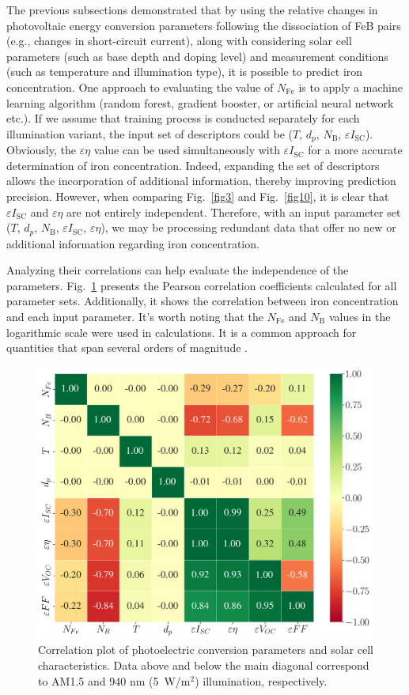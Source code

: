 \documentclass[a4paper,fleqn]{cas-sc}
\begin{document}
The previous subsections demonstrated that by using the relative changes in photovoltaic energy conversion parameters following the dissociation of FeB pairs
(e.g., changes in short-circuit current),
along with considering solar cell parameters (such as base depth and doping level)
and measurement conditions (such as temperature and illumination type), it is possible to predict iron concentration.
One approach to evaluating the value of $N_\mathrm{Fe}$ is to apply a machine learning algorithm (random forest, gradient booster, or artificial neural network etc.).
If we assume that training process is conducted separately for each illumination variant, the input set of descriptors could be
($T$, $d_p$, $N_\mathrm{B}$, $\varepsilon I_\mathrm{SC}$).
Obviously, the $\varepsilon \eta$ value can be used simultaneously with $\varepsilon I_\mathrm{SC}$ for a more accurate determination of iron concentration.
Indeed, expanding the set of descriptors allows the incorporation of additional information, thereby improving prediction precision.
However, when comparing Fig.~\ref{fig3} and Fig.~\ref{fig10}, it is clear that  $\varepsilon I_\mathrm{SC}$ and $\varepsilon \eta$ are not entirely independent.
Therefore, with an input parameter set ($T$, $d_p$, $N_\mathrm{B}$, $\varepsilon I_\mathrm{SC}$, $\varepsilon \eta$),
we may be processing redundant data that offer no new or additional information regarding iron concentration.

Analyzing their correlations can help evaluate the independence of the parameters.
Fig.~\ref{fig12} presents the Pearson correlation coefficients calculated for all parameter sets.
Additionally, it shows the correlation between iron concentration and each input parameter.
It's worth noting that the $N_\mathrm{Fe}$ and $N_\mathrm{B}$ values in the logarithmic scale were used in calculations.
It is a common approach for quantities that span several orders of magnitude \cite{Srivastava2023}.

\begin{figure}
	\centering
     \includegraphics[width=0.6\linewidth]{Fig12.png}
	  \caption{Correlation plot of photoelectric conversion parameters and solar cell characteristics.
      Data above and below the main diagonal correspond to AM1.5 and 940 nm (5~W/m$^2$) illumination, respectively.
}\label{fig12}
\end{figure}
\end{document}
